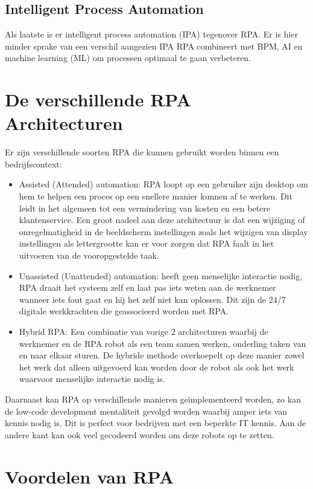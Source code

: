 \subsection{Intelligent Process Automation}
Als laatste is er intelligent process automation (IPA) tegenover RPA. Er is hier minder sprake van een verschil aangezien IPA RPA combineert met BPM, AI en machine learning (ML) om processen optimaal te gaan verbeteren.
\autocite{everythingRPA}

\section{De verschillende RPA Architecturen}
Er zijn verschillende soorten RPA die kunnen gebruikt worden binnen een bedrijfscontext:

\begin{itemize}
	\item Assisted (Attended) automation: RPA loopt op een gebruiker zijn desktop om hem te helpen een proces op een snellere manier kunnen af te werken. Dit leidt in het algemeen tot een vermindering van kosten en een betere klantenservice. Een groot nadeel aan deze architectuur is dat een wijziging of onregelmatigheid in de beeldscherm instellingen zoals het wijzigen van display instellingen als lettergrootte kan er voor zorgen dat RPA faalt in het uitvoeren van de vooropgestelde taak.
	\item Unassisted (Unattended) automation: heeft geen menselijke interactie nodig, RPA draait het systeem zelf en laat pas iets weten aan de werknemer wanneer iets fout gaat en hij het zelf niet kan oplossen. Dit zijn de 24/7 digitale werkkrachten die geassocieerd worden met RPA.
	\item Hybrid RPA: Een combinatie van vorige 2 architecturen waarbij de werknemer en de RPA robot als een team samen werken, onderling taken van en naar elkaar sturen. De hybride methode overkoepelt op deze manier zowel het werk dat alleen uitgevoerd kan worden door de robot als ook het werk waarvoor menselijke interactie nodig is.
\end{itemize}

Daarnaast kan RPA op verschillende manieren geïmplementeerd worden, zo kan de low-code development mentaliteit gevolgd worden waarbij amper iets van kennis nodig is. Dit is perfect voor bedrijven met een beperkte IT kennis. Aan de andere kant kan ook veel gecodeerd worden om deze robots op te zetten.
\autocite{everythingRPA}

\section{Voordelen van RPA}

